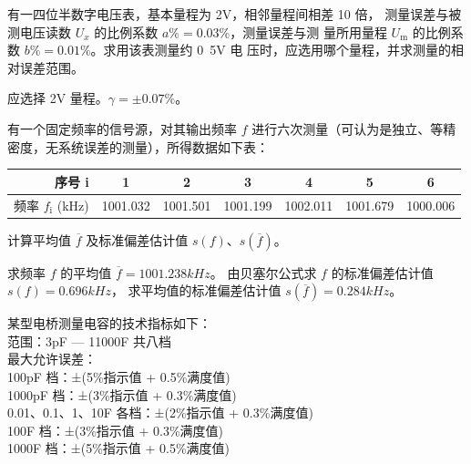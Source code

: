 \documentclass[a4paper,12pt]{examdesign}
\begin{document}
\begin{shortanswer}[title={二、计算题 (每题 10 分，共 80 分)}]

\begin{question}
    有一四位半数字电压表，基本量程为 \unit{2}{V}，相邻量程间相差 10 倍，
    测量误差与被测电压读数 $U_x$ 的比例系数 $a\% = 0.03\%$，测量误差与测
    量所用量程 $U_\mathrm{m}$ 的比例系数 $b\% = 0.01\%$。求用该表测量约 \unit{0.5}{V} 电
    压时，应选用哪个量程，并求测量的相对误差范围。
    \examvspace*{3cm}
    \begin{answer}
        应选择 \unit{2}{V} 量程。$\gamma = \pm 0.07\%$。
    \end{answer}
\end{question}
\begin{question}
有一个固定频率的信号源，对其输出频率 $f$ 进行六次测量（可认为是独立、等精密度，无系统误差的测量），所得数据如下表： 
\begin{table}[H]
\centering
\begin{tabular}{|r|c|c|c|c|c|c|}
    \hline
    序号 i &1 &2 &3 &4 &5 &6 \\ \hline
    频率 $f_\mathrm{i}$ (kHz) &1001.032 &1001.501 &1001.199 &1002.011
    &1001.679 &1000.006 \\
    \hline
\end{tabular}
\end{table}
计算平均值 $\overline{f}$ 及标准偏差估计值 $s(f)$、$s(\overline{f})$。
    \examvspace*{9cm}
    \begin{answer}
        求频率 $f$ 的平均值 $\overline{f} = \unit{1001.238}{kHz}$。
        由贝塞尔公式求 $f$ 的标准偏差估计值 $s(f) = \unit{0.696}{kHz}$，
        求平均值的标准偏差估计值 $s(\overline{f}) = \unit{0.284}{kHz}$。
    \end{answer}
\end{question}
\begin{question}
某型电桥测量电容的技术指标如下：\\
范围：\unit{3}{pF} — \unit{11000}{\micro F}  共八档\\
最大允许误差：\\
\unit{100}{pF} 档：±(5\%指示值 + 0.5\%满度值) \\
\unit{1000}{pF} 档：±(3\%指示值 + 0.3\%满度值) \\
0.01、0.1、1、\unit{10}{\micro F} 各档：±(2\%指示值 + 0.3\%满度值) \\
\unit{100}{\micro F} 档：±(3\%指示值 + 0.3\%满度值) \\
\unit{1000}{\micro F} 档：±(5\%指示值 + 0.5\%满度值) \\

\end{question}
\end{shortanswer}
\end{document}
